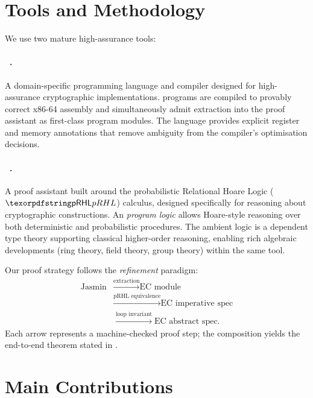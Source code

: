 \section{Tools and Methodology}

We use two mature high-assurance tools:

\paragraph{\jasmin{}~\cite{Almeida2017}.}
A domain-specific programming language and compiler designed for
high-assurance cryptographic implementations.  \jasmin{} programs are compiled
to provably correct x86-64 assembly and simultaneously admit extraction into
the \easycrypt{} proof assistant as first-class program modules.  The language
provides explicit register and memory annotations that remove ambiguity from
the compiler's optimisation decisions.

\paragraph{\easycrypt{}~\cite{Barthe2011,Barthe2013}.}
A proof assistant built around the probabilistic Relational Hoare Logic
($\pRHL$) calculus, designed specifically for reasoning about cryptographic
constructions.  An \easycrypt{} \emph{program logic} allows Hoare-style
reasoning over both deterministic and probabilistic procedures.  The ambient
logic is a dependent type theory supporting classical higher-order reasoning,
enabling rich algebraic developments (ring theory, field theory, group theory)
within the same tool.

Our proof strategy follows the \emph{refinement} paradigm:
\[
\begin{aligned}
  \text{Jasmin}
    &\xrightarrow{\text{extraction}} \text{EC module} \\
    &\xrightarrow{\text{pRHL equivalence}} \text{EC imperative spec} \\
    &\xrightarrow{\text{loop invariant}} \text{EC abstract spec}.
\end{aligned}
\]
Each arrow represents a machine-checked proof step; the composition yields
the end-to-end theorem stated in .

\section{Main Contributions}

